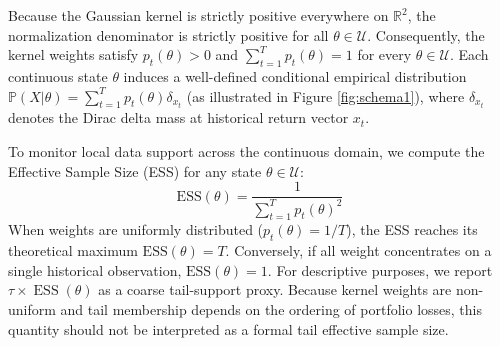 \documentclass[11pt, a4paper]{article}
\begin{document}
Because the Gaussian kernel is strictly positive everywhere on $\mathbb{R}^2$, the normalization denominator is strictly positive for all $\theta \in \mathcal{U}$. Consequently, the kernel weights satisfy $p_t(\theta) > 0$ and $\sum_{t=1}^T p_t(\theta) = 1$ for every $\theta \in \mathcal{U}$. Each continuous state $\theta$ induces a well-defined conditional empirical distribution $\mathbb{P}(X | \theta) = \sum_{t=1}^{T} p_t(\theta) \delta_{x_t}$ (as illustrated in Figure \ref{fig:schema1}), where $\delta_{x_t}$ denotes the Dirac delta mass at historical return vector $x_t$.

To monitor local data support across the continuous domain, we compute the Effective Sample Size (ESS) for any state $\theta \in \mathcal{U}$:
\begin{equation}
    \text{ESS}(\theta) = \frac{1}{\sum_{t=1}^T p_t(\theta)^2}
\end{equation}
When weights are uniformly distributed ($p_t(\theta) = 1/T$), the ESS reaches its theoretical maximum $\text{ESS}(\theta) = T$. Conversely, if all weight concentrates on a single historical observation, $\text{ESS}(\theta) = 1$. For descriptive purposes, we report $\tau\times \operatorname{ESS}(\theta)$ as a coarse tail-support proxy. Because kernel weights are non-uniform and tail membership depends on the ordering of portfolio losses, this quantity should not be interpreted as a formal tail effective sample size.
\end{document}
